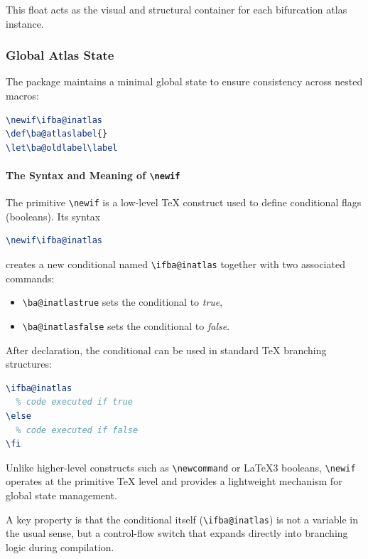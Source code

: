 This float acts as the visual and structural container for each bifurcation atlas instance.

\subsubsection{Global Atlas State}

The package maintains a minimal global state to ensure consistency across nested macros:

\begin{lstlisting}[language=LaTeX]
\newif\ifba@inatlas
\def\ba@atlaslabel{}
\let\ba@oldlabel\label
\end{lstlisting}
\paragraph{The Syntax and Meaning of \texttt{\textbackslash newif}}

The primitive \lstinline|\newif| is a low-level \TeX{} construct used to define conditional flags (booleans). Its syntax

\begin{lstlisting}[language=LaTeX]
\newif\ifba@inatlas
\end{lstlisting}

creates a new conditional named \lstinline|\ifba@inatlas| together with two associated commands:

\begin{itemize}
\item \lstinline|\ba@inatlastrue| sets the conditional to \emph{true},
\item \lstinline|\ba@inatlasfalse| sets the conditional to \emph{false}.
\end{itemize}

After declaration, the conditional can be used in standard \TeX{} branching structures:

\begin{lstlisting}[language=LaTeX]
\ifba@inatlas
  % code executed if true
\else
  % code executed if false
\fi
\end{lstlisting}

Unlike higher-level constructs such as \lstinline|\newcommand| or \LaTeX3 booleans, \lstinline|\newif| operates at the primitive \TeX{} level and provides a lightweight mechanism for global state management.

A key property is that the conditional itself (\lstinline|\ifba@inatlas|) is not a variable in the usual sense, but a control-flow switch that expands directly into branching logic during compilation.

